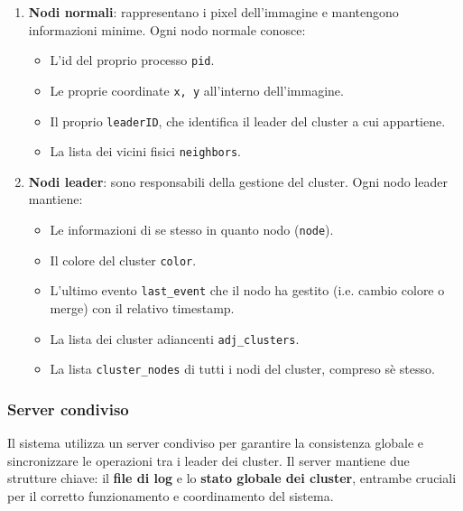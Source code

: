 \documentclass[12pt, a4paper]{report}
\begin{document}
\begin{enumerate}
    \item \textbf{Nodi normali}: rappresentano i pixel dell'immagine e mantengono informazioni minime. Ogni nodo normale conosce:
    \begin{itemize}
        \item L'id del proprio processo \texttt{pid}.
        \item Le proprie coordinate \texttt{x, y} all'interno dell'immagine.
        \item Il proprio \texttt{leaderID}, che identifica il leader del cluster a cui appartiene.
        \item La lista dei vicini fisici \texttt{neighbors}.
    \end{itemize}

    \item \textbf{Nodi leader}: sono responsabili della gestione del cluster. Ogni nodo leader mantiene:
    \begin{itemize}
        \item Le informazioni di se stesso in quanto nodo (\texttt{node}).
        \item Il colore del cluster \texttt{color}.
        \item L'ultimo evento \texttt{last\_event} che il nodo ha gestito (i.e. cambio colore o merge) con il relativo timestamp.
        \item La lista dei cluster adiancenti \texttt{adj\_clusters}.
        \item La lista \texttt{cluster\_nodes} di tutti i nodi del cluster, compreso s\`e stesso.
    \end{itemize}
\end{enumerate}

\subsubsection{Server condiviso} 
Il sistema utilizza un server condiviso per garantire la consistenza globale e sincronizzare le operazioni tra i leader dei cluster. Il server mantiene due strutture chiave: il \textbf{file di log} e lo \textbf{stato globale dei cluster}, entrambe cruciali per il corretto funzionamento e coordinamento del sistema.
\end{document}
